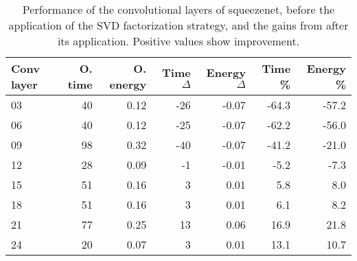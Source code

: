 \begin{table}
\centering
\begin{tabular}{|l|r|r|r|r|r|r|}
\hline
Conv layer & O. time & O. energy & Time $\Delta$ & Energy $\Delta$ & Time \% & Energy \% \\\hline
03 & 40 & 0.12 & -26 & -0.07 & -64.3 & -57.2 \\\hline
06 & 40 & 0.12 & -25 & -0.07 & -62.2 & -56.0 \\\hline
09 & 98 & 0.32 & -40 & -0.07 & -41.2 & -21.0 \\\hline
12 & 28 & 0.09 & -1 & -0.01 & -5.2 & -7.3 \\\hline
15 & 51 & 0.16 & 3 & 0.01 & 5.8 & 8.0 \\\hline
18 & 51 & 0.16 & 3 & 0.01 & 6.1 & 8.2 \\\hline
21 & 77 & 0.25 & 13 & 0.06 & 16.9 & 21.8 \\\hline
24 & 20 & 0.07 & 3 & 0.01 & 13.1 & 10.7 \\\hline
\end{tabular}
\caption{Performance of the convolutional layers of squeezenet, before the application of the SVD factorization strategy, and the gains from after its application. Positive values show improvement.}
\label{squeezenet-performance}
\end{table}
